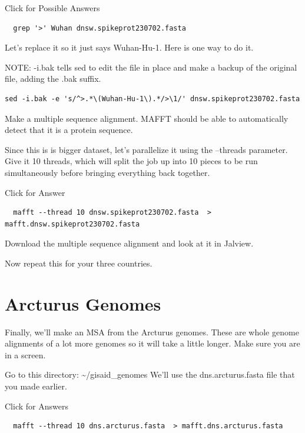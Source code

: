 \documentclass[
]{book}
\begin{document}
Click for Possible Answers

\begin{verbatim}
  grep '>' Wuhan dnsw.spikeprot230702.fasta
\end{verbatim}

\hfill\break

Let's replace it so it just says Wuhan-Hu-1. Here is one way to do it.

NOTE: -i.bak tells sed to edit the file in place and make a backup of the original file, adding the .bak suffix.

\begin{verbatim}
sed -i.bak -e 's/^>.*\(Wuhan-Hu-1\).*/>\1/' dnsw.spikeprot230702.fasta
\end{verbatim}

Make a multiple sequence alignment. MAFFT should be able to automatically detect that it is a protein sequence.

Since this is is bigger dataset, let's parallelize it using the --threads parameter. Give it 10 threads, which will split the job up into 10 pieces to be run simultaneously before bringing everything back together.

Click for Answer

\begin{verbatim}
  mafft --thread 10 dnsw.spikeprot230702.fasta  > mafft.dnsw.spikeprot230702.fasta
\end{verbatim}

\hfill\break

Download the multiple sequence alignment and look at it in Jalview.

Now repeat this for your three countries.

\hypertarget{arcturus-genomes}{%
\section{Arcturus Genomes}\label{arcturus-genomes}}

Finally, we'll make an MSA from the Arcturus genomes. These are whole genome alignments of a lot more genomes so it will take a little longer. Make sure you are in a screen.

Go to this directory: \textasciitilde/gisaid\_genomes
We'll use the dns.arcturus.fasta file that you made earlier.

Click for Answers

\begin{verbatim}
  mafft --thread 10 dns.arcturus.fasta  > mafft.dns.arcturus.fasta
\end{verbatim}
\end{document}
